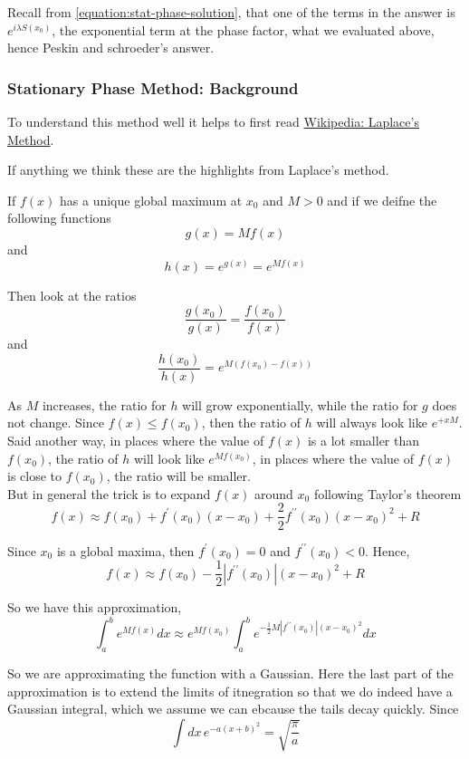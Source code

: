 Recall from \ref{equation:stat-phase-solution}, that one of the terms in the answer is
$e^{ i\lambda S(x_0) }$, the exponential term at the phase factor, what we evaluated above,
hence Peskin and schroeder's answer.








\subsubsection{Stationary Phase Method: Background}

To understand this method well it helps to first read
\href{https://en.wikipedia.org/wiki/Laplace%27s_method}{Wikipedia: Laplace's Method}.

If anything we think these are the highlights from Laplace's method.

If $f(x)$ has a unique global maximum at $x_0$ and $M>0$ and if we deifne the following functions
$$
g(x) = Mf(x)
$$
and
$$
h(x) = e^{g(x)} = e^{Mf(x)}
$$

Then look at the ratios
$$
\frac{g(x_0)}{g(x)} = \frac{f(x_0)}{f(x)}
$$
and
$$
\frac{h(x_0)}{h(x)} = e^{M(f(x_0) - f(x))}
$$

As $M$ increases, the ratio for $h$ will grow exponentially, while the ratio for $g$ does not change.
Since $f(x) \leq f(x_0)$, then the ratio of $h$ will always look like $e^{+{x}M}$.
Said another way, in places where the value of $f(x)$ is a lot smaller than $f(x_0)$, the ratio of $h$ will look like
$e^{Mf(x_0)}$, in places where the value of $f(x)$ is close to $f(x_0)$, the ratio will be smaller.
\\

But in general the trick is to expand $f(x)$ around $x_0$ following Taylor's theorem
$$
f(x) \approx
    f(x_0) + f^{\prime} (x_0) (x-x_0) + \frac{2}{2} f^{\prime\prime} (x_0) (x-x_0)^2 + R
$$

Since $x_0$ is a global maxima, then $f^{\prime} (x_0) = 0$ and $f^{\prime\prime} (x_0) < 0$.
Hence,
$$
f(x) \approx
    f(x_0) - \frac{1}{2} |f^{\prime\prime} (x_0)| (x-x_0)^2 + R
$$

So we have this approximation,
$$
\int_{a}^{b} e^{Mf(x)} dx \approx
    e^{Mf(x_0)} \int_{a}^{b} e^{- \frac{1}{2} M |f^{\prime\prime} (x_0)| (x-x_0)^2} dx
$$

So we are approximating the function with a Gaussian.
Here the last part of the approximation is to extend the limits of itnegration so that we do indeed have a Gaussian integral,
which we assume we can ebcause the tails decay quickly.
Since
$$
\int dx\, e^{-a(x+b)^2} = \sqrt{ \frac{\pi}{a} }
$$

